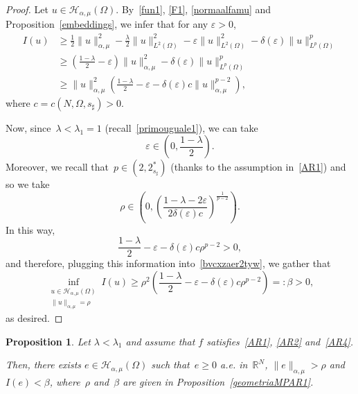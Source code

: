 \documentclass[12pt,a4paper,intlimits,sumlimits]{amsart}
\def \R {\mathbb{R}}
\theoremstyle{definition}
\theoremstyle{plain}
\newtheorem{proposition}[definition]{Proposition}
\numberwithin{equation}{section}
\renewcommand{\geq}{\geqslant}
\renewcommand{\ge}{\geqslant}
\begin{document}
\begin{proof}
Let $u\in \mathcal{H}_{\alpha,\mu}(\Omega)$. By~\eqref{fun1}, \eqref{F1}, \eqref{normaalfamu} and Proposition~\ref{embeddings}, we infer that for any $\varepsilon>0$,
\begin{equation}\label{bvcxzaer2tyw}
\begin{split}
I(u) & \ge \frac12 \|u\|^2_{\alpha, \mu} -\frac{\lambda}{2} \|u\|^2_{L^2(\Omega)} -\varepsilon\|u\|^2_{L^2(\Omega)} - \delta(\varepsilon)\|u\|^p_{L^p(\Omega)}\\
& \ge\left(\frac{1-\lambda}{2} -\varepsilon\right) \|u\|^2_{\alpha, \mu} -\delta(\varepsilon)\|u\|^p_{L^p(\Omega)}\\
&\ge \|u\|^2_{\alpha, \mu} \left(\frac{1-\lambda}{2}-\varepsilon -\delta(\varepsilon) c  \|u\|^{p-2}_{\alpha, \mu}\right),
\end{split}
\end{equation}
where $c=c(N, \Omega, s_\sharp)>0$.

Now, since~$\lambda<\lambda_1=1$ (recall~\eqref{primouguale1}), we can take 
\[
\varepsilon\in\left(0, \frac{1-\lambda}{2}\right).
\]
Moreover, we recall that~$p\in (2, 2^*_{s_\sharp})$ (thanks to the
assumption in~\eqref{AR1}) and so we take
\[
\rho \in\left(0, \left(\frac{1-\lambda-2\varepsilon}{2\delta(\varepsilon) c} \right)^{\frac{1}{p-2}}\right).
\]
In this way,
\[
\frac{1-\lambda}{2}-\varepsilon -\delta(\varepsilon) c\rho^{p-2}>0, 
\]
and therefore,
plugging this information into~\eqref{bvcxzaer2tyw}, we gather that
\[
\inf_{\substack{u\in \mathcal{H}_{\alpha,\mu}(\Omega)\\ \|u\|_{\alpha, \mu}=\rho}} I(u)\ge \rho^2 \left(\frac{1-\lambda}{2}-\varepsilon -\delta(\varepsilon) c\rho^{p-2}\right) =:\beta >0,
\]
as desired.
\end{proof}

\begin{proposition}\label{geometriaMPAR2}
Let $\lambda<\lambda_1$ and assume that $f$ satisfies~\eqref{AR1}, \eqref{AR2} and~\eqref{AR4}.

Then, there exists $e\in \mathcal{H}_{\alpha,\mu}(\Omega)$ such that~$e\geq 0$ a.e. in~$\R^N$, $\|e\|_{\alpha,\mu}>\rho$ and~$I(e)<\beta$, where~$\rho$ and~$\beta$ are given in Proposition~\ref{geometriaMPAR1}.
\end{proposition}
\end{document}
